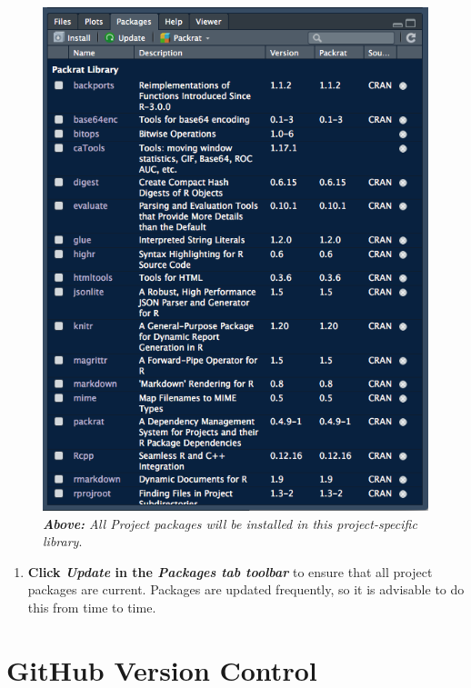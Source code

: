 \documentclass[]{book}
\providecommand{\tightlist}{%
  \setlength{\itemsep}{0pt}\setlength{\parskip}{0pt}}
\theoremstyle{definition}
\theoremstyle{definition}
\theoremstyle{definition}
\theoremstyle{remark}
\begin{document}
\begin{figure}
\centering
\includegraphics{images/RStudio_packages.png}
\caption{\emph{\textbf{Above:} All Project packages will be installed in
this project-specific library}.}
\end{figure}

\begin{enumerate}
\def\labelenumi{\arabic{enumi}.}
\setcounter{enumi}{8}
\tightlist
\item
  \textbf{Click \emph{Update} in the \emph{Packages tab toolbar}} to
  ensure that all project packages are current. Packages are updated
  frequently, so it is advisable to do this from time to time.
\end{enumerate}

\hypertarget{github-version-control}{%
\section{GitHub Version Control}\label{github-version-control}}
\end{document}
